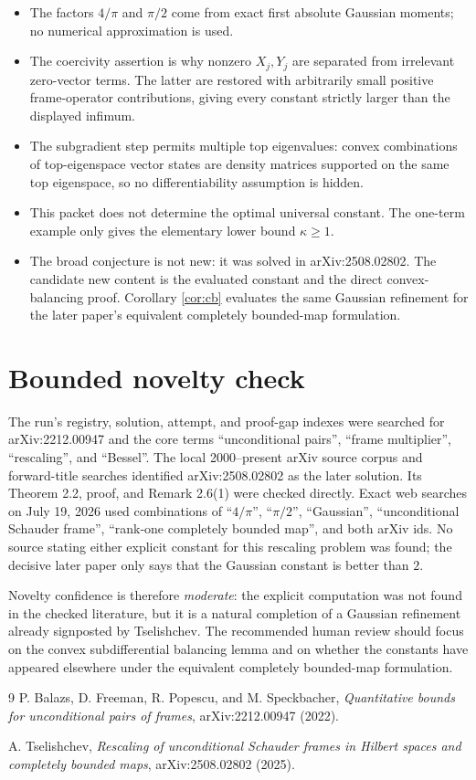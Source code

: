 \documentclass[11pt]{article}
\begin{document}
\begin{itemize}
\item The factors $4/\pi$ and $\pi/2$ come from exact first absolute
Gaussian moments; no numerical approximation is used.
\item The coercivity assertion is why nonzero $X_j,Y_j$ are separated from
irrelevant zero-vector terms.  The latter are restored with arbitrarily
small positive frame-operator contributions, giving every constant strictly
larger than the displayed infimum.
\item The subgradient step permits multiple top eigenvalues: convex
combinations of top-eigenspace vector states are density matrices supported
on the same top eigenspace, so no differentiability assumption is hidden.
\item This packet does not determine the optimal universal constant.  The
one-term example only gives the elementary lower bound $\kappa\geq1$.
\item The broad conjecture is not new: it was solved in
arXiv:2508.02802.  The candidate new content is the evaluated constant and
the direct convex-balancing proof.  Corollary \ref{cor:cb} evaluates the same
Gaussian refinement for the later paper's equivalent completely bounded-map
formulation.
\end{itemize}

\section*{Bounded novelty check}

The run's registry, solution, attempt, and proof-gap indexes were searched
for arXiv:2212.00947 and the core terms ``unconditional pairs'', ``frame
multiplier'', ``rescaling'', and ``Bessel''.  The local 2000--present arXiv
source corpus and forward-title searches identified arXiv:2508.02802 as the
later solution.  Its Theorem 2.2, proof, and Remark 2.6(1) were checked
directly.  Exact web searches on July 19, 2026 used combinations of
``$4/\pi$'', ``$\pi/2$'', ``Gaussian'', ``unconditional Schauder frame'',
``rank-one completely bounded map'', and both arXiv ids.  No source stating
either explicit constant for this rescaling problem was found; the decisive
later paper only says that the Gaussian constant is better than $2$.

Novelty confidence is therefore \emph{moderate}: the explicit computation
was not found in the checked literature, but it is a natural completion of a
Gaussian refinement already signposted by Tselishchev.  The recommended
human review should focus on the convex subdifferential balancing lemma and
on whether the constants have appeared elsewhere under the equivalent
completely bounded-map formulation.

\begin{thebibliography}{9}
P. Balazs, D. Freeman, R. Popescu, and M. Speckbacher,
\emph{Quantitative bounds for unconditional pairs of frames},
arXiv:2212.00947 (2022).

A. Tselishchev,
\emph{Rescaling of unconditional Schauder frames in Hilbert spaces and
completely bounded maps}, arXiv:2508.02802 (2025).
\end{thebibliography}
\end{document}
